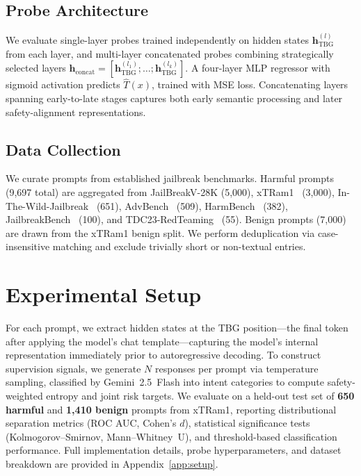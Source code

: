 \documentclass[10pt]{cai}
\begin{document}
\subsection{Probe Architecture}

We evaluate single-layer probes trained independently on hidden states $\mathbf{h}^{(l)}_{\text{TBG}}$ from each layer, and multi-layer concatenated probes combining strategically selected layers $\mathbf{h}_{\text{concat}} = [\mathbf{h}^{(l_1)}_{\text{TBG}}; \ldots; \mathbf{h}^{(l_k)}_{\text{TBG}}]$. A four-layer MLP regressor with sigmoid activation predicts $\hat{T}(x)$, trained with MSE loss. Concatenating layers spanning early-to-late stages captures both early semantic processing and later safety-alignment representations.

\subsection{Data Collection}

We curate prompts from established jailbreak benchmarks. Harmful prompts (9,697 total) are aggregated from JailBreakV-28K (5,000), xTRam1~\cite{xtram2024} (3,000), In-The-Wild-Jailbreak~\cite{wildjailbreak2024} (651), AdvBench~\cite{advbench2024} (509), HarmBench~\cite{harmbench2024} (382), JailbreakBench~\cite{jailbreakbench2024} (100), and TDC23-RedTeaming~\cite{tdc2023} (55). Benign prompts (7,000) are drawn from the xTRam1 benign split. We perform deduplication via case-insensitive matching and exclude trivially short or non-textual entries.


\section{Experimental Setup}

For each prompt, we extract hidden states at the TBG position---the final token after applying the model's chat template---capturing the model's internal representation immediately prior to autoregressive decoding. To construct supervision signals, we generate $N$ responses per prompt via temperature sampling, classified by Gemini~2.5~Flash into intent categories to compute safety-weighted entropy and joint risk targets. We evaluate on a held-out test set of \textbf{650 harmful} and \textbf{1,410 benign} prompts from xTRam1, reporting distributional separation metrics (ROC AUC, Cohen's $d$), statistical significance tests (Kolmogorov--Smirnov, Mann--Whitney~U), and threshold-based classification performance. Full implementation details, probe hyperparameters, and dataset breakdown are provided in Appendix~\ref{app:setup}.
\end{document}
